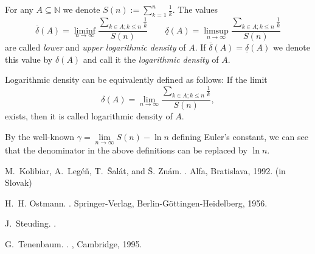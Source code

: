 \documentclass[12pt]{article}
\newcommand{\N}[0]{\mathbb{N}}
\newcommand{\ol}[1]{\overline{#1}}
\newcommand{\ul}[1]{\underline{#1}}
\newcommand{\limti}[1]{\lim\limits_{#1\to\infty}}
\begin{document}
For any $A\subseteq\N$ we denote $S(n):=\sum\limits_{k=1}^n \frac 1k$. The values
$$\ol \delta(A)=\liminf_{n\to\infty} \frac{\sum\limits_{k\in A; k\leq n} \frac 1k}{S(n)} \qquad \ul \delta(A) = \limsup_{n\to\infty}
\frac{\sum\limits_{k\in A; k\leq n} \frac 1k}{S(n)}$$ are called
\emph{lower} and \emph{upper logarithmic density} of $A$. If
$\ol\delta(A)=\ul\delta(A)$ we denote this value by $\delta(A)$
and call it the \emph{logarithmic density} of $A$.

Logarithmic density can be equivalently defined as follows: If the limit
$$\delta(A)=\limti n \frac{\sum\limits_{k\in A; k\leq n} \frac 1k}{S(n)},$$
exists, then it is called logarithmic density of $A$.

By the well-known  $\gamma = \limti n S(n) - \ln n$
defining Euler's constant, we can see that the denominator in the
above definitions can be replaced by $\ln n$.

\begin{thebibliography}{1}

M.~Kolibiar, A.~Leg\'e\v{n}, T.~\v{S}al\'at, and \v{S}. Zn\'am.
.
\newblock Alfa, Bratislava, 1992. (in Slovak)

H.~H. Ostmann.
.
\newblock Springer-Verlag, Berlin-G\"ottingen-Heidelberg, 1956.

J.~Steuding.
\newblock {}.

G.~Tenenbaum.
.
, Cambridge, 1995.

\end{thebibliography}
\end{document}
